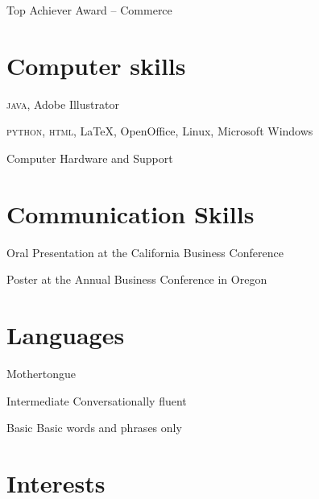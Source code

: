 \documentclass[11pt,a4paper,sans]{moderncv}
\begin{document}
       {Top Achiever Award -- Commerce}


\section{Computer skills}
       {\textsc{java}, Adobe Illustrator}

       {\textsc{python}, \textsc{html}, \LaTeX, OpenOffice, Linux, Microsoft Windows}

       {Computer Hardware and Support}


\section{Communication Skills}
       {Oral Presentation at the California Business Conference}

       {Poster at the Annual Business Conference in Oregon}


\section{Languages}
                  {Mothertongue}
                  {}

                  {Intermediate}
                  {Conversationally fluent}

                  {Basic}
                  {Basic words and phrases only}


\section{Interests}
\renewcommand{\listitemsymbol}{-~} %

\end{document}
